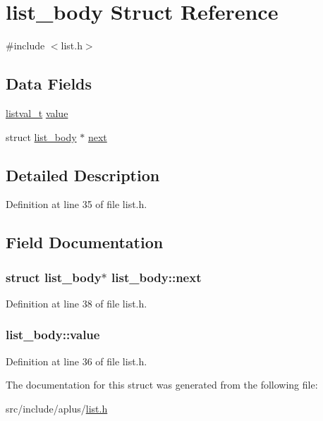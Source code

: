 \hypertarget{structlist__body}{\section{list\+\_\+body Struct Reference}
\label{structlist__body}
}


{\ttfamily \#include $<$list.\+h$>$}

\subsection*{Data Fields}
\begin{DoxyCompactItemize}
\item 
\hyperlink{list_8h_a83bc1af7566502e08756b8d8c425972e}{listval\+\_\+t} \hyperlink{structlist__body_ae3194d24911b82410a61d50f5e6f588d}{value}
\item 
struct \hyperlink{structlist__body}{list\+\_\+body} $\ast$ \hyperlink{structlist__body_ae0f31e0790456c070895880578d171ca}{next}
\end{DoxyCompactItemize}


\subsection{Detailed Description}


Definition at line 35 of file list.\+h.



\subsection{Field Documentation}
\hypertarget{structlist__body_ae0f31e0790456c070895880578d171ca}{
\subsubsection[{next}]{\setlength{\rightskip}{0pt plus 5cm}struct {\bf list\+\_\+body}$\ast$ list\+\_\+body\+::next}}\label{structlist__body_ae0f31e0790456c070895880578d171ca}


Definition at line 38 of file list.\+h.

\hypertarget{structlist__body_ae3194d24911b82410a61d50f5e6f588d}{
\subsubsection[{value}]{ list\+\_\+body\+::value}}\label{structlist__body_ae3194d24911b82410a61d50f5e6f588d}


Definition at line 36 of file list.\+h.



The documentation for this struct was generated from the following file\+:\begin{DoxyCompactItemize}
\item 
src/include/aplus/\hyperlink{list_8h}{list.\+h}\end{DoxyCompactItemize}
